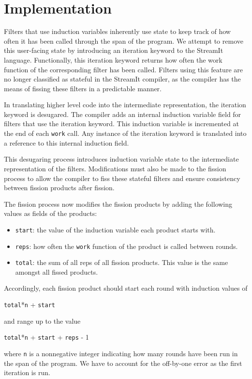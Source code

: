 \section{Implementation}

Filters that use induction variables inherently use state to keep track of
how often it has been called through the span of the program.  We attempt 
to remove this user-facing state by introducing an iteration keyword to the 
StreamIt language.  Functionally, this iteration keyword returns how often 
the work function of the corresponding filter has been called.  Filters 
using this feature are no longer classified as stateful in the StreamIt
compiler, as the compiler has the means of fissing these filters in a 
predictable manner.

In translating higher level code into the intermediate representation, the 
iteration keyword is desugared.  The compiler adds an internal induction 
variable field for filters that use the iteration keyword.  This induction
variable is incremented at the end of each \texttt{work} call.  Any instance
of the iteration keyword is translated into a reference to this internal 
induction field.  

This desugaring process introduces induction variable state to the intermediate
representation of the filters.  Modifications must also be made to the fission 
process to allow the compiler to fiss these stateful filters and ensure 
consistency between fission products after fission.  

The fission process now modifies the fission products by adding the 
following values as fields of the products:
\begin{itemize}
	\item \texttt{start}: the value of the induction variable each product starts with.
	\item \texttt{reps}: how often the \texttt{work} function of the product is 
	  called between rounds.
	\item \texttt{total}: the sum of all reps of all fission products. This value is 
	  the same amongst all fissed products.
\end{itemize}
Accordingly, each fission product should start each round with induction values
of
\begin{center}
\texttt{total}*\texttt{n} + \texttt{start}
\end{center}
and range up to the value
\begin{center}
\texttt{total}*\texttt{n} + \texttt{start} + \texttt{reps} - 1
\end{center}
where \texttt{n} is a nonnegative integer indicating how many rounds have
been run in the span of the program.  We have to account for the off-by-one
error as the first iteration is run.

